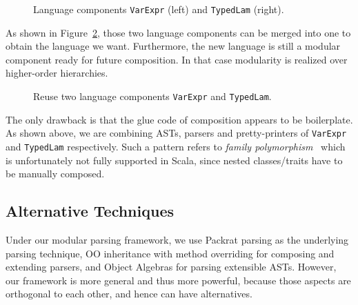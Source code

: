 \begin{figure}[t]
\caption{Language components \lstinline{VarExpr} (left) and \lstinline{TypedLam} (right).}\label{fig:lng-components}
\end{figure}

As shown in Figure~\ref{fig:compose-components}, those two language components can be merged into one to obtain the language we want. Furthermore, the new language is still a modular
component ready for future composition. In that case modularity is realized over higher-order hierarchies.

\begin{figure}[t]
\caption{Reuse two language components \lstinline{VarExpr} and \lstinline{TypedLam}.}\label{fig:compose-components}
\end{figure}

The only drawback is that the glue code of composition appears to be
boilerplate. As shown above, we are combining ASTs, parsers and
pretty-printers of \lstinline{VarExpr} and \lstinline{TypedLam}
respectively. Such a pattern refers to \textit{family
  polymorphism}~\cite{ernst01FP} which is unfortunately not fully supported
in Scala, since nested classes/traits have to be manually composed.

\subsection{Alternative Techniques}

Under our modular parsing framework, we use Packrat parsing as the underlying parsing technique, OO inheritance with method overriding for composing and extending parsers, and Object Algebras for parsing extensible ASTs. However, our framework is more general and thus more powerful, because those aspects are orthogonal to each other, and hence can have alternatives.

